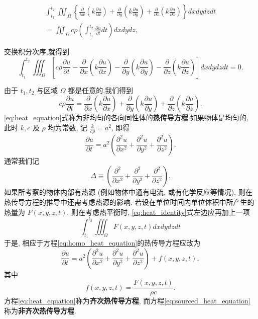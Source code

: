 \begin{equation}
\begin{gathered}
\int_{t_1}^{t_2} \iiint_{\Omega}\left\{\frac{\partial}{\partial x}\left(k \frac{\partial u}{\partial x}\right)+\frac{\partial}{\partial y}\left(k \frac{\partial u}{\partial y}\right)+\frac{\partial}{\partial z}\left(k \frac{\partial u}{\partial z}\right)\right\} d x d y d z d t \\
=\iiint_{\Omega} c \rho\left(\int_{t_1}^{t_2} \frac{\partial u}{\partial t} d t\right) d x d y d z,
\label{eq:heat_identity}
\end{gathered}
\end{equation}

交换积分次序,就得到
$$
\int_{t_1}^{t_2} \iiint_{\Omega}\left[c \rho \frac{\partial u}{\partial t}-\frac{\partial}{\partial x}
\left(k \frac{\partial u}{\partial x}\right)-\frac{\partial}{\partial y}
\left(k \frac{\partial u}{\partial y}\right)-\frac{\partial}{\partial z}
\left(k \frac{\partial u}{\partial z}\right)\right] d x d y d z d t=0 .
$$

由于 $t_1, t_2$ 与区域 $\Omega$ 都是任意的,我们得到
\begin{equation}
c \rho \frac{\partial u}{\partial t}=\frac{\partial}{\partial x}
\left(k \frac{\partial u}{\partial x}\right)+\frac{\partial}{\partial y}
\left(k \frac{\partial u}{\partial y}\right)+\frac{\partial}{\partial z}
\left(k \frac{\partial u}{\partial z}\right) .
\label{eq:heat_equation}
\end{equation}
\ref{eq:heat_equation}式称为非均匀的各向同性体的\textbf{热传导方程}.如果物体是均匀的, 
此时 $k, c$ 及 $\rho$ 均为常数, 记 $\frac{k}{c \rho}=a^2$, 即得
\begin{equation}
\frac{\partial u}{\partial t}=a^2\left(\frac{\partial^2 u}{\partial x^2}
+\frac{\partial^2 u}{\partial y^2}+\frac{\partial^2 u}{\partial z^2}\right) .
\label{eq:homo_heat_equation}
\end{equation}
通常我们记
\begin{equation}
   \Delta \equiv \left(\frac{\partial^2 }{\partial x^2}
+\frac{\partial^2 }{\partial y^2}+\frac{\partial^2 }{\partial z^2}\right) .
    \label{eq:Delta}
\end{equation}
如果所考察的物体内部有热源 (例如物体中通有电流, 或有化学反应等情况), 则在热传导方程的推导中还需考虑热源的影响.
若设在单位时间内单位体积中所产生的热量为 $F(x, y, z, t)$, 则在考虑热平衡时, \ref{eq:heat_identity}式左边应再加上一项
$$
\int_{t_1}^{t_2} \iiint_{\Omega} F(x, y, z, t) d x d y d z d t
$$
于是, 相应于方程\ref{eq:homo_heat_equation}的热传导方程应改为
\begin{equation}
    \frac{\partial u}{\partial t}=a^2\left(\frac{\partial^2 u}{\partial x^2}+
    \frac{\partial^2 u}{\partial y^2}+\frac{\partial^2 u}{\partial z^2}\right)+f(x, y, z, t),
    \label{eq:sourced_heat_equation}
\end{equation}
其中
$$
f(x, y, z, t)=\frac{F(x, y, z, t)}{\rho c} .
$$
方程\ref{eq:heat_equation}称为\textbf{齐次热传导方程}, 而方程\ref{eq:sourced_heat_equation} 称为\textbf{非齐次热传导方程}.



